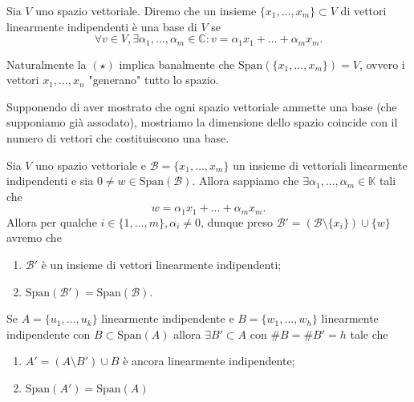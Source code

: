 \documentclass[12pt, twoside, italian, openany]{book}
\begin{document}
	\begin{definition}
		Sia $V$ uno spazio vettoriale. Diremo che un insieme $\{ x_1, \ldots, x_m \} \subset V$ di vettori linearmente indipendenti è una base di $V$ se
		\begin{equation*}
		\forall v \in V, \exists \alpha_1, \ldots, \alpha_m \in \mathbb{C} : v = \alpha_1 x_1 + \ldots + \alpha_m x_m. \tag{$\star$}
		\end{equation*}
	\end{definition}
	\begin{remark}
		Naturalmente la $(\star)$ implica banalmente che $\text{Span}(\{ x_1, \ldots, x_m \}) = V$, ovvero i vettori $x_1, \ldots, x_n$ "generano" tutto lo spazio.
	\end{remark}
	Supponendo di aver mostrato che ogni spazio vettoriale ammette una base (che supponiamo già assodato), mostriamo la dimensione dello spazio coincide con il numero di vettori che costituiscono una base.
	\begin{lemma}
		Sia $V$ uno spazio vettoriale e $\mathcal{B} = \{ x_1, \ldots, x_m \}$ un insieme di vettoriali linearmente indipendenti e sia $0 \neq w \in \text{Span}(\mathcal{B})$. Allora sappiamo che $\exists \alpha_1, \ldots, \alpha_m \in \mathbb{K}$ tali che
		$$
		w = \alpha_1 x_1 + \ldots + \alpha_m x_m.
		$$
		Allora per qualche $i \in \{ 1, \ldots, m \}, \alpha_i \neq 0$, dunque preso $\mathcal{B}' = (\mathcal{B} \setminus \{ x_i \}) \cup \{ w \}$ avremo che
		\begin{enumerate}[label=\protect\circled{\arabic*}]
			\item $\mathcal{B}'$ è un insieme di vettori linearmente indipendenti;
			\item $\text{Span}(\mathcal{B}') = \text{Span}(\mathcal{B})$.
		\end{enumerate}
	\end{lemma}
	\begin{cor}
		Se $A = \{ u_1, \ldots, u_k \}$ linearmente indipendente e $B = \{ w_1, \ldots, w_h \}$ linearmente indipendente con $B \subset \text{Span}(A)$ allora $\exists B' \subset A$ con $\# B = \# B' = h$ tale che
		\begin{enumerate}[label=\protect\circled{\arabic*}]
			\item $A' = (A \setminus B') \cup B$ è ancora linearmente indipendente;
			\item $\text{Span}(A') = \text{Span}(A)$
		\end{enumerate}
	\end{cor}
\end{document}
